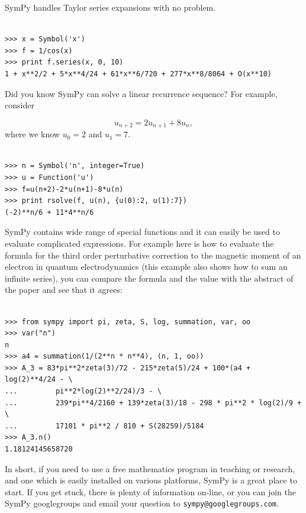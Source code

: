 \documentclass[12pt]{article}
\begin{document}
SymPy handles Taylor series expansions with no problem.

\begin{Verbatim}[fontsize=\scriptsize,fontfamily=courier,fontshape=tt,frame=single,label=SymPy]

>>> x = Symbol('x')
>>> f = 1/cos(x)
>>> print f.series(x, 0, 10)
1 + x**2/2 + 5*x**4/24 + 61*x**6/720 + 277*x**8/8064 + O(x**10)

\end{Verbatim}

Did you know SymPy can solve a linear recurrence sequence?
For example, consider

\[
 u_{n+2} = 2  u_{n+1} + 8  u_{n}, 
\]
where we know $u_{0} = 2$ and $u_{1} = 7$.

\begin{Verbatim}[fontsize=\scriptsize,fontfamily=courier,fontshape=tt,frame=single,label=SymPy]

>>> n = Symbol('n', integer=True)
>>> u = Function('u')
>>> f=u(n+2)-2*u(n+1)-8*u(n)
>>> print rsolve(f, u(n), {u(0):2, u(1):7})
(-2)**n/6 + 11*4**n/6

\end{Verbatim}

SymPy contains wide range of special functions and it can easily be used to
evaluate complicated expressions. For example here is how to evaluate the
formula for the third order perturbative correction to the
magnetic moment of an electron in quantum electrodynamics (this example also
shows how to sum an infinite series), you can compare the formula and the value
with the abstract of the paper \cite{QED} and see that it agrees:

\begin{Verbatim}[fontsize=\scriptsize,fontfamily=courier,fontshape=tt,frame=single,label=SymPy]

>>> from sympy import pi, zeta, S, log, summation, var, oo
>>> var("n")
n
>>> a4 = summation(1/(2**n * n**4), (n, 1, oo))
>>> A_3 = 83*pi**2*zeta(3)/72 - 215*zeta(5)/24 + 100*(a4 + log(2)**4/24 - \
...         pi**2*log(2)**2/24)/3 - \
...         239*pi**4/2160 + 139*zeta(3)/18 - 298 * pi**2 * log(2)/9 + \
...         17101 * pi**2 / 810 + S(28259)/5184
>>> A_3.n()
1.18124145658720

\end{Verbatim}

\vskip 0.3in

In short, if you need to use a free mathematics program in teaching or
research, and one which is easily installed on various platforms,
SymPy is a great place to start. If you get stuck, there is plenty of
information
on-line, or you can join the SymPy googlegroups and
email your question to {\tt sympy@googlegroups.com}.
\end{document}
